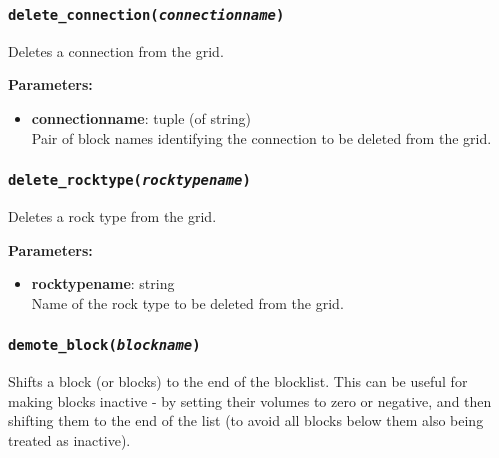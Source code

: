 \begin{snugshade}
\subsubsection{\texttt{delete\_connection(\emph{connectionname})}}
\end{snugshade}
\label{sec:t2grid:delete_connection}

Deletes a connection from the grid.

\textbf{Parameters:}
\begin{itemize}
\item \textbf{connectionname}: tuple (of string)\\
  Pair of block names identifying the connection to be deleted from the grid.
\end{itemize}

\begin{snugshade}
\subsubsection{\texttt{delete\_rocktype(\emph{rocktypename})}}
\end{snugshade}
\label{sec:t2grid:delete_rocktype}

Deletes a rock type from the grid.

\textbf{Parameters:}
\begin{itemize}
\item \textbf{rocktypename}: string\\
  Name of the rock type to be deleted from the grid.
\end{itemize}

\begin{snugshade}
\subsubsection{\texttt{demote\_block(\emph{blockname})}}
\end{snugshade}
\label{sec:t2grid:demote_block}

Shifts a block (or blocks) to the end of the blocklist.  This can be useful for making blocks inactive - by setting their volumes to zero or negative, and then shifting them to the end of the list (to avoid all blocks below them also being treated as inactive).

